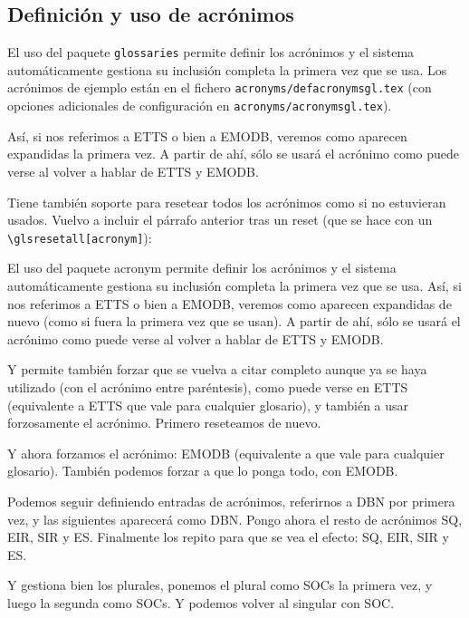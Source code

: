 \subsection{Definición y uso de acrónimos}
\label{sec:uso-de-acronimos}

El uso del paquete \texttt{glossaries} permite definir los acrónimos y el sistema automáticamente gestiona su inclusión completa la primera vez que se usa. Los acrónimos de ejemplo están en el fichero \texttt{acronyms/defacronymsgl.tex} (con opciones adicionales de configuración en \texttt{acronyms/acronymsgl.tex}).

Así, si nos referimos a \ac{ETTS} o bien a \ac{EMODB}, veremos como aparecen expandidas la primera vez. A partir de ahí, sólo se usará el acrónimo como puede verse al volver a hablar de \ac{ETTS} y \ac{EMODB}.

Tiene también soporte para resetear todos los acrónimos como si no estuvieran usados. Vuelvo a incluir el párrafo anterior tras un reset (que se hace con un \texttt{\textbackslash{}glsresetall[acronym]}):

\glsresetall[acronym]

El uso del paquete acronym permite definir los acrónimos y el sistema automáticamente gestiona su inclusión completa la primera vez que se usa. Así, si nos referimos a \ac{ETTS} o bien a \ac{EMODB}, veremos como aparecen expandidas de nuevo (como si fuera la primera vez que se usan). A partir de ahí, sólo se usará el acrónimo como puede verse al volver a hablar de \ac{ETTS} y \ac{EMODB}.

Y permite también forzar que se vuelva a citar completo aunque ya se haya utilizado (con el acrónimo entre paréntesis), como puede verse en \acl{ETTS} (equivalente a \glsdesc{ETTS} que vale para cualquier glosario), y también a usar forzosamente el acrónimo. Primero reseteamos de nuevo.

\glsresetall[acronym]

Y ahora forzamos el acrónimo: \acs{EMODB} (equivalente a  que vale para cualquier glosario). También podemos forzar a que lo ponga todo, con \acf{EMODB}.


Podemos seguir definiendo entradas de acrónimos, referirnos a \ac{DBN} por primera vez, y las siguientes aparecerá como \ac{DBN}. Pongo ahora el resto de acrónimos \ac{SQ}, \ac{EIR}, \ac{SIR} y \ac{ES}. Finalmente los repito para que se vea el efecto: \ac{SQ}, \ac{EIR}, \ac{SIR} y \ac{ES}.

Y gestiona bien los plurales, ponemos el plural como \acp{SOC} la primera vez, y luego la segunda como \acp{SOC}. Y podemos volver al singular con \ac{SOC}.


